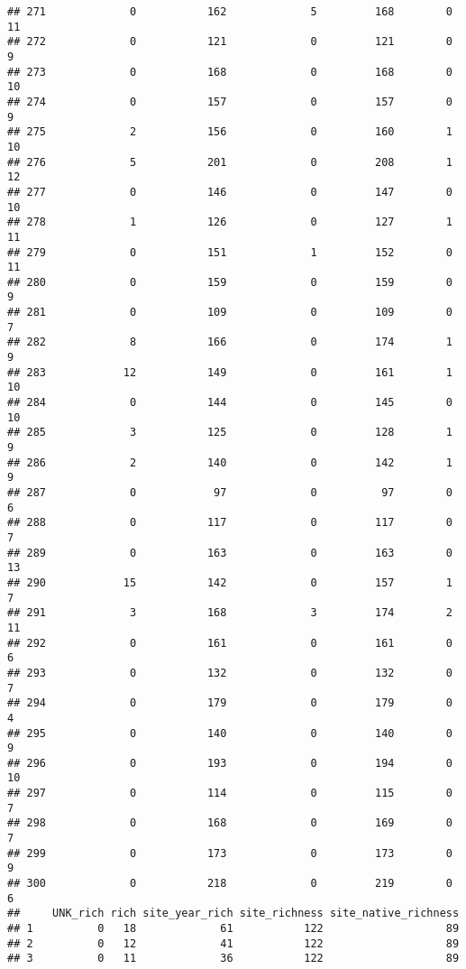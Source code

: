 \documentclass[]{article}
\begin{document}
\begin{verbatim}
## 271             0           162             5         168        0       11
## 272             0           121             0         121        0        9
## 273             0           168             0         168        0       10
## 274             0           157             0         157        0        9
## 275             2           156             0         160        1       10
## 276             5           201             0         208        1       12
## 277             0           146             0         147        0       10
## 278             1           126             0         127        1       11
## 279             0           151             1         152        0       11
## 280             0           159             0         159        0        9
## 281             0           109             0         109        0        7
## 282             8           166             0         174        1        9
## 283            12           149             0         161        1       10
## 284             0           144             0         145        0       10
## 285             3           125             0         128        1        9
## 286             2           140             0         142        1        9
## 287             0            97             0          97        0        6
## 288             0           117             0         117        0        7
## 289             0           163             0         163        0       13
## 290            15           142             0         157        1        7
## 291             3           168             3         174        2       11
## 292             0           161             0         161        0        6
## 293             0           132             0         132        0        7
## 294             0           179             0         179        0        4
## 295             0           140             0         140        0        9
## 296             0           193             0         194        0       10
## 297             0           114             0         115        0        7
## 298             0           168             0         169        0        7
## 299             0           173             0         173        0        9
## 300             0           218             0         219        0        6
##     UNK_rich rich site_year_rich site_richness site_native_richness
## 1          0   18             61           122                   89
## 2          0   12             41           122                   89
## 3          0   11             36           122                   89

\end{verbatim}
\end{document}

